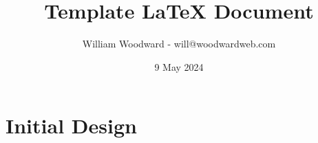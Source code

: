 \documentclass[10pt]{article}
\title{Template LaTeX Document}
\date{9 May 2024}
\author{
William Woodward - will@woodwardweb.com
}
\begin{document}
\maketitle

\pagebreak
\tableofcontents

\pagebreak

\section{Initial Design}


% 
% 
\end{document}
